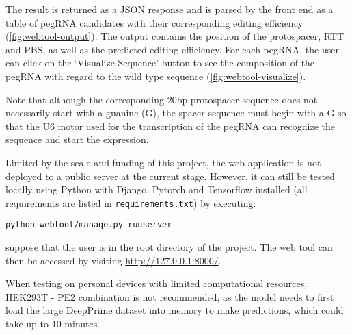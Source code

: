 The result is returned as a JSON response and is parsed by the front end as a table of pegRNA candidates with their corresponding editing efficiency (\autoref{fig:webtool-output}). The output contains the position of the protospacer, RTT and PBS, as well as the predicted editing efficiency. For each pegRNA, the user can click on the `Visualize Sequence' button to see the composition of the pegRNA with regard to the wild type sequence (\autoref{fig:webtool-visualize}).

Note that although the corresponding 20bp protospacer sequence does not necessarily start with a guanine (G), the spacer sequence must begin with a G so that the U6 motor used for the transcription of the pegRNA can recognize the sequence and start the expression\cite{hsieh-fengEfficientExpressionMultiple2020}. 

Limited by the scale and funding of this project, the web application is not deployed to a public server at the current stage. However, it can still be tested locally using Python with Django, Pytorch and Tensorflow installed (all requirements are listed in \verb|requirements.txt|) by executing:

\verb|python webtool/manage.py runserver|

suppose that the user is in the root directory of the project. The web tool can then be accessed by visiting \url{http://127.0.0.1:8000/}. 

When testing on personal devices with limited computational resources, HEK293T - PE2 combination is not recommended, as the model needs to first load the large DeepPrime dataset into memory to make predictions, which could take up to 10 minutes.